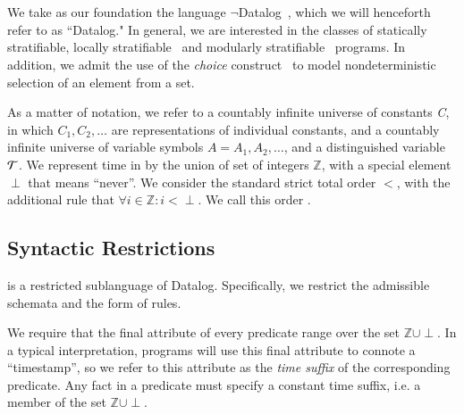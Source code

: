 \section{\lang}
We take as our foundation the language $\lnot$Datalog~\cite{ullmanbook},
which we will henceforth refer to as ``Datalog."
In general, we are interested in the classes of
statically stratifiable, locally stratifiable~\cite{prz} and modularly stratifiable~\cite{modular}
programs.  In
addition, we admit the use of the \emph{choice} construct~\cite{greedychoice,
eventchoice} to model nondeterministic selection of an element from a set.  

As a matter of notation, we refer to a countably infinite universe of constants
\emph{C}, in which $C_{1}, C_{2}, \ldots$ are representations of individual
constants, and a countably infinite universe of variable symbols $A = A_1, A_2,
\ldots$, and a distinguished variable $\Tau$. 
We represent time in \lang by the union of set of integers $\mathbb{Z}$, with a
special element $\perp$ that means ``never''.  We consider the standard strict
total order $<$, with the additional rule that $\forall i \in \mathbb{Z}: i <
\perp$.  We call this order .


\subsection{Syntactic Restrictions}

\lang is a restricted sublanguage of Datalog.  Specifically, we
restrict the admissible schemata and the form of rules.

We require that the final attribute of every \lang
predicate range over the set $\mathbb{Z} \cup \perp$.  In a typical
interpretation, \slang programs will use this final attribute to connote a
``timestamp'', so we refer to this attribute as the \emph{time suffix} of the
corresponding predicate.  Any fact in a \lang predicate must specify a
constant time suffix, i.e. a member of the set $\mathbb{Z} \cup \perp$.

